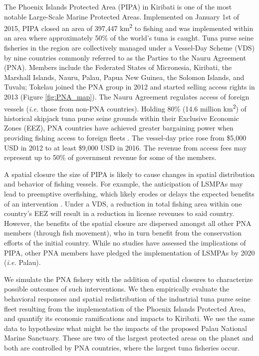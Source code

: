 \documentclass[9p,twocolumn,twoside,lineno]{pnas-new}
\begin{document}
The Phoenix Islands Protected Area (PIPA) in Kiribati is one of the most notable Large-Scale Marine Protected Areas. Implemented on January 1st of 2015, PIPA closed an area of 397,447 km\textsuperscript{2} to fishing and was implemented within an area where approximately 50\% of the world's tuna is caught. Tuna purse seine fisheries in the region are collectively managed under a Vessel-Day Scheme (VDS) by nine countries commonly referred to as the Parties to the Nauru Agreement (PNA). Members include the Federated States of Micronesia, Kiribati, the Marshall Islands, Nauru, Palau, Papua New Guinea, the Solomon Islands, and Tuvalu; Tokelau joined the PNA group in 2012 and started selling access rights in 2013 (Figure \ref{fig:PNA_map}). The Nauru Agreement regulates access of foreign vessels (\emph{i.e.} those from non-PNA countries). Holding 80\% (14.6 million km\textsuperscript{2}) of historical skipjack tuna purse seine grounds within their Exclusive Economic Zones (EEZ), PNA countries have achieved greater bargaining power when providing fishing access to foreign fleets \cite{havice_2010}. The vessel-day price rose from \$5,000 USD in 2012 to at least \$9,000 USD in 2016. The revenue from access fees may represent up to 50\% of government revenue for some of the members.

A spatial closure the size of PIPA is likely to cause changes in spatial distribution and behavior of fishing vessels. For example, the anticipation of LSMPAs may lead to preemptive overfishing, which likely erodes or delays the expected benefits of an intervention \cite{mcdermott_2018,hanich2018unraveling}. Under a VDS, a reduction in total fishing area within one country's EEZ will result in a reduction in license revenues to said country. However, the benefits of the spatial closure are dispersed amongst all other PNA members (through fish movement), who in turn benefit from the conservation efforts of the initial country. While no studies have assessed the implications of PIPA, other PNA members have pledged the implementation of LSMPAs by 2020 (\emph{i.e.} Palau).

We simulate the PNA fishery with the addition of spatial closures to characterize possible outcomes of such interventions. We then empirically evaluate the behavioral responses and spatial redistribution of the industrial tuna purse seine fleet resulting from the implementation of the Phoenix Islands Protected Area, and quantify its economic ramifications and impacts to Kiribati. We use the same data to hypothesize what might be the impacts of the proposed Palau National Marine Sanctuary. These are two of the largest protected areas on the planet and both are controlled by PNA countries, where the largest tuna fisheries occur.
\end{document}
